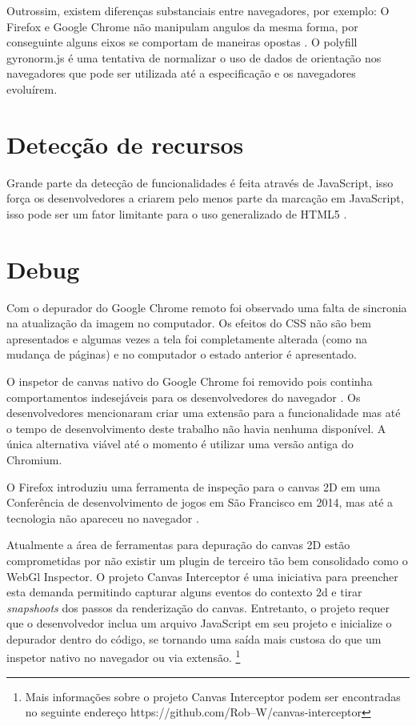 Outrossim, existem diferenças substanciais entre navegadores, por
exemplo: O Firefox e Google Chrome não manipulam angulos da mesma
forma, por conseguinte alguns eixos se comportam de maneiras opostas
\autocite{mdnOrientation}. O polyfill gyronorm.js é uma tentativa de
normalizar o uso de dados de orientação nos navegadores que pode ser
utilizada até a especificação e os navegadores evoluírem.

\section{Detecção de recursos}

Grande parte da detecção de funcionalidades é feita através de
JavaScript, isso força os desenvolvedores a criarem pelo menos parte da
marcação em JavaScript, isso pode ser um fator limitante para o uso
generalizado de HTML5 \autocite{diveIntohtml}.

\section{Debug}

Com o depurador do Google Chrome remoto foi observado uma falta de
sincronia na atualização da imagem no computador. Os efeitos do CSS
não são bem apresentados e algumas vezes a tela foi completamente
alterada (como na mudança de páginas) e no computador o estado
anterior é apresentado.

O inspetor de canvas nativo do Google Chrome foi removido pois continha
comportamentos indesejáveis para os desenvolvedores do navegador
\autocite{canvasinspector}. Os desenvolvedores mencionaram criar uma
extensão para a funcionalidade mas até o tempo de desenvolvimento
deste trabalho não havia nenhuma disponível. A única alternativa
viável até o momento é utilizar uma versão antiga do Chromium.

O Firefox introduziu uma ferramenta de inspeção para o canvas 2D
em uma Conferência de desenvolvimento de jogos em São Francisco em 2014,
mas até a tecnologia não apareceu no navegador \autocite{firefoxCanvasDebug}.

Atualmente a área de ferramentas para depuração do canvas 2D estão
comprometidas por não existir um plugin de terceiro tão bem
consolidado como o WebGl Inspector. O projeto Canvas Interceptor é
uma iniciativa para preencher esta demanda permitindo capturar alguns
eventos do contexto 2d e tirar \textit{snapshoots} dos passos da renderização
do canvas. Entretanto, o projeto requer que o desenvolvedor inclua
um arquivo JavaScript em seu projeto e inicialize o depurador dentro do código,
se tornando uma saída mais custosa do que um inspetor nativo no
navegador ou via extensão. \footnote{Mais informações sobre o
projeto Canvas Interceptor podem ser encontradas no seguinte endereço
https://github.com/Rob--W/canvas-interceptor}

